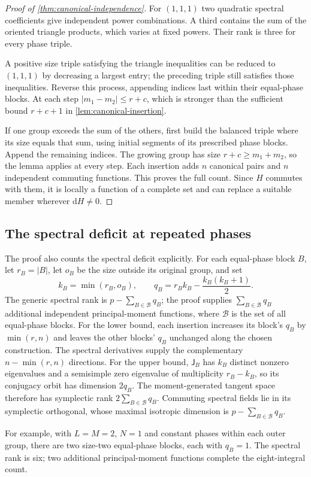 \begin{proof}[Proof of \cref{thm:canonical-independence}]
For $(1,1,1)$ two quadratic spectral coefficients give independent
power combinations. A third contains the sum of the oriented triangle
products, which varies at fixed powers. Their rank is three for every
phase triple.

A positive size triple satisfying the triangle inequalities can be
reduced to $(1,1,1)$ by decreasing a largest entry; the preceding triple
still satisfies those inequalities. Reverse this process, appending
indices last within their equal-phase blocks. At each step
$|m_1-m_2|\leq r+c$, which is stronger than the sufficient
bound $r+c+1$ in \cref{lem:canonical-insertion}.

If one group exceeds the sum of the others, first build the balanced
triple where its size equals that sum, using initial segments of its
prescribed phase blocks. Append the remaining indices. The growing
group has size $r+c\geq m_1+m_2$, so the lemma applies at every step.
Each insertion adds $n$ canonical pairs and $n$ independent commuting
functions. This proves the full count. Since $H$ commutes with them,
it is locally a function of a complete set and can replace a suitable
member wherever $\mathrm dH\ne0$.
\end{proof}

\subsection{The spectral deficit at repeated phases}

The proof also counts the spectral deficit explicitly. For each
equal-phase block $B$, let $r_B=|B|$, let $o_B$ be the size outside its
original group, and set
\begin{equation}\label{eq:canonical-spectral-deficit}
 k_B=\min(r_B,o_B),\qquad
 q_B=r_Bk_B-\frac{k_B(k_B+1)}2.
\end{equation}
The generic spectral rank is $p-\sum_{B\in\mathcal B}q_B$; the proof
supplies $\sum_{B\in\mathcal B}q_B$ additional independent
principal-moment functions, where $\mathcal B$ is the set of all
equal-phase blocks.
For the lower bound, each insertion increases its block's $q_B$ by
$\min(r,n)$ and leaves the other blocks' $q_B$ unchanged along the
chosen construction. The spectral derivatives supply the complementary
$n-\min(r,n)$ directions. For the upper bound, $\mathsf J_B$ has
$k_B$ distinct nonzero eigenvalues and a semisimple zero eigenvalue of
multiplicity $r_B-k_B$, so its conjugacy orbit has dimension $2q_B$.
The moment-generated tangent space therefore has symplectic rank
$2\sum_{B\in\mathcal B}q_B$. Commuting spectral fields lie in its
symplectic orthogonal, whose maximal isotropic dimension is
$p-\sum_{B\in\mathcal B}q_B$.

For example, with $L=M=2$, $N=1$ and constant phases within each
outer group, there are two size-two equal-phase blocks, each with
$q_B=1$. The spectral rank is six; two additional principal-moment
functions complete the eight-integral count.

